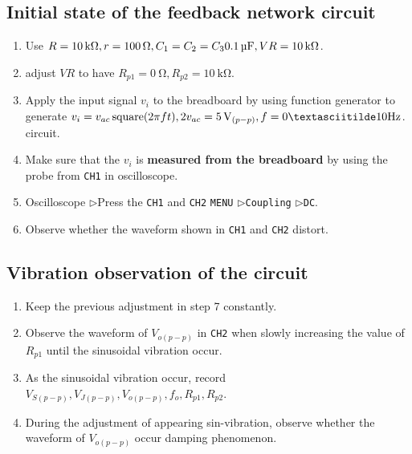 \documentclass[12pt, a4paper]{article}
\newcommand{\tri}{$\rhd$}
\begin{document}
\subsection{Initial state of the feedback network circuit}
\begin{enumerate}[itemsep=0pt]
  \item Use $R = \SI{10}\kohm, r = \SI{100}\ohm, C_1 = C_2 = C_3 \SI{0.1}\uF, VR = \SI{10}\kohm$.
  \item adjust $VR$ to have $R_{p1} = \SI{0}\ohm, R_{p2} = \SI{10}\kohm$.
  \item Apply the input signal $v_i$ to the breadboard by using function generator to generate
    $v_i = v_{ac} \operatorname{\text{square}}(2 \pi f t), 2 v_{ac} = \SI{5}\V_{(p-p)}, f = 0 \textasciitilde 10 \si{\Hz}$.
    circuit.
  \item Make sure that the $v_i$ is {\bf measured from the breadboard} by using the probe
    from \texttt{CH1} in oscilloscope.
  \item Oscilloscope \tri Press the \texttt{CH1} and \texttt{CH2} \texttt{MENU} \tri \texttt{Coupling} \tri \texttt{DC}.
  \item Observe whether the waveform shown in \texttt{CH1} and \texttt{CH2} distort.
\end{enumerate}

\subsection{Vibration observation of the circuit}
\begin{enumerate}[itemsep=0pt]
  \item Keep the previous adjustment in step 7 constantly.
  \item Observe the waveform of $V_{o(p-p)}$ in \texttt{CH2} when slowly increasing the value
    of $R_{p1}$ until the sinusoidal vibration occur.
  \item As the sinusoidal vibration occur, record $V_{S(p-p)},V_{J(p-p)},V_{o(p-p)}, f_o, R_{p1}, R_{p2}$.
  \item During the adjustment of appearing sin-vibration, observe whether the 
    waveform of $V_{o(p-p)}$ occur damping phenomenon.
\end{enumerate}
\end{document}
